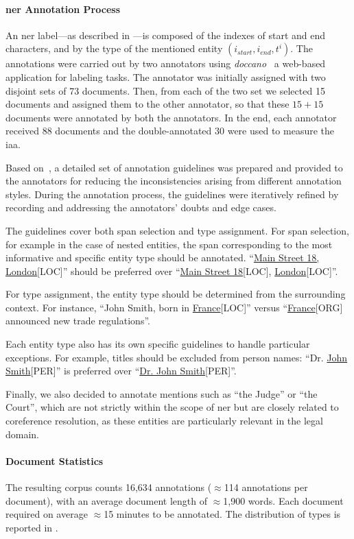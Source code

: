 \paragraph{\ac{ner} Annotation Process}
An \ac{ner} label---as described in ---is composed of the indexes of start and end characters, and by the type of the mentioned entity $(i_{start},i_{end},t^i)$.
The annotations were carried out by two annotators using \textit{doccano}~\cite{doccano} a web-based application for labeling tasks. The annotator was initially assigned with two disjoint sets of 73 documents. Then, from each of the two set we selected 15 documents and assigned them to the other annotator, so that these $15+15$ documents were annotated by both the annotators. In the end, each annotator received 88 documents and the double-annotated 30 were used to measure the \ac{iaa}.  


Based on~\cite{jha2017all}, a detailed set of annotation guidelines was prepared and provided to the annotators for reducing the inconsistencies arising from different annotation styles. During the annotation process, the guidelines were iteratively refined by recording and addressing the annotators' doubts and edge cases.

The guidelines cover both span selection and type assignment.  
For span selection, for example in the case of nested entities, the span corresponding to the most informative and specific entity type should be annotated. ``\underline{Main Street 18, London}[LOC]'' should be preferred over ``\underline{Main Street 18}[LOC], \underline{London}[LOC]''.  

For type assignment, the entity type should be determined from the surrounding context. For instance, ``John Smith, born in \underline{France}[LOC]'' versus ``\underline{France}[ORG] announced new trade regulations''.  

Each entity type also has its own specific guidelines to handle particular exceptions. For example, titles should be excluded from person names: ``Dr. \underline{John Smith}[PER]'' is preferred over ``\underline{Dr. John Smith}[PER]''.

Finally, we also decided to annotate mentions such as ``the Judge'' or ``the Court'', which are not strictly within the scope of \ac{ner} but are closely related to coreference resolution, as these entities are particularly relevant in the legal domain.




\paragraph{Document Statistics}
The resulting corpus counts 16,634 annotations ($\approx$114 annotations per document), with an average document length of $\approx$1,900 words. Each document required on average $\approx$15 minutes to be annotated. The distribution of types is reported in .


